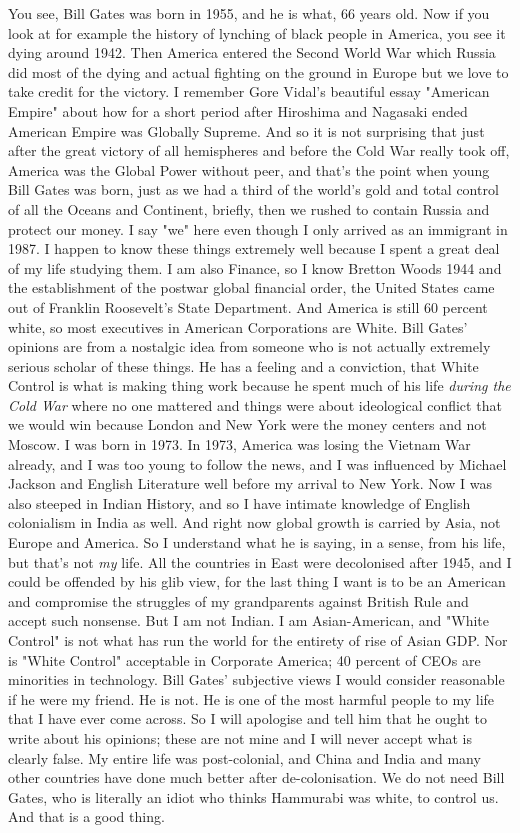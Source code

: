 \documentclass{amsart}
\begin{document}
You see, Bill Gates was born in 1955, and he is what, 66 years old.  Now if you look at for example the history of lynching of black people in America, you see it dying around 1942.  Then America entered the Second World War which Russia did most of the dying and actual fighting on the ground in Europe but we love to take credit for the victory.  I remember Gore Vidal's beautiful essay "American Empire" about how for a short period after Hiroshima and Nagasaki ended American Empire was Globally Supreme.  And so it is not surprising that just after the great victory of all hemispheres and before the Cold War really took off, America was the Global Power without peer, and that's the point when young Bill Gates was born, just as we had a third of the world's gold and total control of all the Oceans and Continent, briefly, then we rushed to contain Russia and protect our money.  I say "we" here even though I only arrived as an immigrant in 1987.  I happen to know these things extremely well because I spent a great deal of my life studying them.  I am also Finance, so I know Bretton Woods 1944 and the establishment of the postwar global financial order, the United States came out of Franklin Roosevelt's State Department.  And America is still 60 percent white, so most executives in American Corporations are White.  Bill Gates' opinions are from a nostalgic idea from someone who is not actually extremely serious scholar of these things.  He has a feeling and a conviction, that White Control is what is making thing work because he spent much of his life {\em during the Cold War} where no one mattered and things were about ideological conflict that we would win because London and New York were the money centers and not Moscow.  I was born in 1973.  In 1973, America was losing the Vietnam War already, and I was too young to follow the news, and I was influenced by Michael Jackson and English Literature well before my arrival to New York.  Now I was also steeped in Indian History, and so I have intimate knowledge of English colonialism in India as well.  And right now global growth is carried by Asia, not Europe and America.  So I understand what he is saying, in a sense, from his life, but that's not {\em my} life.  All the countries in East were decolonised after 1945, and I could be offended by his glib view, for the last thing I want is to be an American and compromise the struggles of my grandparents against British Rule and accept such nonsense.  But I am not Indian.  I am Asian-American, and "White Control" is not what has run the world for the entirety of rise of Asian GDP.  Nor is "White Control" acceptable in Corporate America; 40 percent of CEOs are minorities in technology.  Bill Gates' subjective views I would consider reasonable if he were my friend.  He is not. He is one of the most harmful people to my life that I have ever come across.  So I will apologise and tell him that he ought to write about his opinions; these are not mine and I will never accept what is clearly false.  My entire life was post-colonial, and China and India and many other countries have done much better after de-colonisation.  We do not need Bill Gates, who is literally an idiot who thinks Hammurabi was white, to control us.  And that is a good thing.
\end{document}
